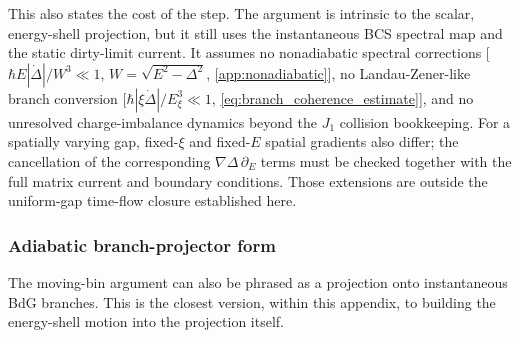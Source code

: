 \documentclass[
  aps,
  prb,
  preprint,
  superscriptaddress,
  longbibliography,
  nofootinbib
]{revtex4-2}
\begin{document}
This also states the cost of the step. The argument is intrinsic to the
scalar, energy-shell projection, but it still uses the instantaneous BCS
spectral map and the static dirty-limit current. It assumes no nonadiabatic
spectral corrections [\(\hbar E|\dot\Delta|/W^3\ll1\),
\(W=\sqrt{E^2-\Delta^2}\), \cref{app:nonadiabatic}], no Landau-Zener-like
branch conversion [\(\hbar|\xi\dot\Delta|/E_\xi^3\ll1\),
\cref{eq:branch_coherence_estimate}], and no unresolved
charge-imbalance dynamics beyond the \(J_1\) collision bookkeeping. For a
spatially varying gap, fixed-\(\xi\) and fixed-\(E\) spatial gradients also
differ; the cancellation of the corresponding \(\nabla\Delta\,\partial_E\)
terms must be checked together with the full matrix current and boundary
conditions. Those extensions are outside the uniform-gap time-flow closure
established here.

\subsubsection{Adiabatic branch-projector form}
\label{sec:branch_projector_lift}

The moving-bin argument can also be phrased as a projection onto instantaneous
BdG branches. This is the closest version, within this appendix, to building the
energy-shell motion into the projection itself.
\end{document}
